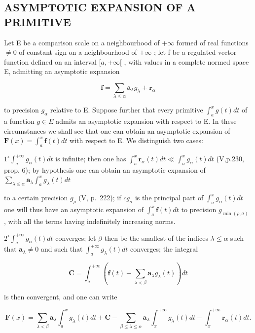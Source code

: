 \subsection{ASYMPTOTIC EXPANSION OF A PRIMITIVE}

Let E be a comparison scale on a neighbourhood of \(+\infty\) formed of real functions \(\neq 0\) of constant sign on a neighbourhood of \(+\infty\) ; let f be a regulated vector function defined on an interval \([a, +\infty[\) , with values in a complete normed space E, admitting an asymptotic expansion

\[
\mathbf {f} = \sum_ {\lambda \leqslant \alpha} \mathbf {a} _ {\lambda} g _ {\lambda} + \mathbf {r} _ {\alpha}
\]

to precision \(g_{\alpha}\) relative to E. Suppose further that every primitive \(\int_{a}^{x} g(t) dt\) of a function \(g \in E\) admits an asymptotic expansion with respect to E. In these circumstances we shall see that one can obtain an asymptotic expansion of \(\mathbf{F}(x) = \int_{a}^{x} \mathbf{f}(t) dt\) with respect to E. We distinguish two cases:

\(1^{\circ}\int_{a}^{+\infty}g_{\alpha}(t)dt\) is infinite; then one has \(\int_{a}^{x}\mathbf{r}_{\alpha}(t)dt\ll \int_{a}^{x}g_{\alpha}(t)dt\) (V,p.230, prop. 6); by hypothesis one can obtain an asymptotic expansion of \(\sum_{\lambda \leqslant \alpha}\mathbf{a}_{\lambda}\int_{a}^{x}g_{\lambda}(t)dt\)

to a certain precision \(g_{\rho}\) (V, p.~222); if \(cg_{\sigma}\) is the principal part of \(\int_{a}^{x} g_{\alpha}(t) dt\) one will thus have an asymptotic expansion of \(\int_{a}^{x} \mathbf{f}(t) dt\) to precision \(g_{\min(\rho, \sigma)}\) , with all the terms having indefinitely increasing norms.

\(2^{\circ}\int_{a}^{+\infty}g_{\alpha}(t)dt\) converges; let \(\beta\) then be the smallest of the indices \(\lambda \leqslant \alpha\) such that \(\mathbf{a}_{\lambda}\neq 0\) and such that \(\int_{a}^{+\infty}g_{\lambda}(t)dt\) converges; the integral

\[
\mathbf {C} = \int_ {a} ^ {+ \infty} \left(\mathbf {f} (t) - \sum_ {\lambda <   \beta} \mathbf {a} _ {\lambda} g _ {\lambda} (t)\right) d t
\]

is then convergent, and one can write

\[
\mathbf {F} (x) = \sum_ {\lambda <   \beta} \mathbf {a} _ {\lambda} \int_ {a} ^ {x} g _ {\lambda} (t) d t + \mathbf {C} - \sum_ {\beta \leqslant \lambda \leqslant \alpha} \mathbf {a} _ {\lambda} \int_ {x} ^ {+ \infty} g _ {\lambda} (t) d t - \int_ {x} ^ {+ \infty} \mathbf {r} _ {\alpha} (t) d t.
\]

